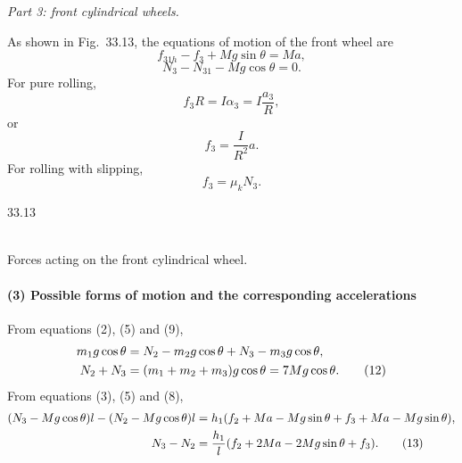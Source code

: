 \emph{Part 3: front cylindrical wheels.}

As shown in Fig.~33.13, the equations of motion of the front wheel are
\begin{equation}
f_{31h}-f_3+Mg\sin\theta=Ma, \tag{8}
\end{equation}
\begin{equation}
N_3-N_{31}-Mg\cos\theta=0. \tag{9}
\end{equation}
For pure rolling,
\[
f_3R=I\alpha_3=I\frac{a_3}{R},
\]
or
\begin{equation}
f_3=\frac{I}{R^2}a. \tag{10}
\end{equation}
For rolling with slipping,
\begin{equation}
f_3=\mu_kN_3. \tag{11}
\end{equation}

\begin{figbox}{33.13}
\\[2pt]{\small Forces acting on the front cylindrical wheel.}
\end{figbox}

\paragraph{(3) Possible forms of motion and the corresponding accelerations}

From equations (2), (5) and (9),
\begin{align}
m_1g\cos\theta&=N_2-m_2g\cos\theta+N_3-m_3g\cos\theta,\notag\\
N_2+N_3&=(m_1+m_2+m_3)g\cos\theta=7Mg\cos\theta. \tag{12}
\end{align}
From equations (3), (5) and (8),
\begin{align}
(N_3-Mg\cos\theta)l-(N_2-Mg\cos\theta)l
&=h_1(f_2+Ma-Mg\sin\theta+f_3+Ma-Mg\sin\theta),\notag\\
N_3-N_2&=\frac{h_1}{l}(f_2+2Ma-2Mg\sin\theta+f_3). \tag{13}
\end{align}

